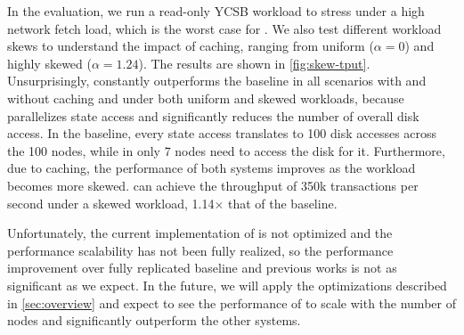 In the evaluation, we run a read-only YCSB workload to stress \sys under a high network fetch load, which is the worst case for \sys.
We also test different workload skews to understand the impact of caching, ranging from uniform ($\alpha=0$) and highly skewed ($\alpha=1.24$).
The results are shown in \cref{fig:skew-tput}.
Unsurprisingly, \sys constantly outperforms the baseline in all scenarios with and without caching and under both uniform and skewed workloads, because \sys parallelizes state access and significantly reduces the number of overall disk access.
In the baseline, every state access translates to 100 disk accesses across the 100 nodes, while in \sys only 7 nodes need to access the disk for it.
Furthermore, due to caching, the performance of both systems improves as the workload becomes more skewed.
\sys can achieve the throughput of 350k transactions per second under a skewed workload, 1.14$\times$ that of the baseline.

Unfortunately, the current implementation of \sys is not optimized and the performance scalability has not been fully realized, so the performance improvement over fully replicated baseline and previous works is not as significant as we expect.
In the future, we will apply the optimizations described in \cref{sec:overview} and expect to see the performance of \sys to scale with the number of nodes and significantly outperform the other systems.